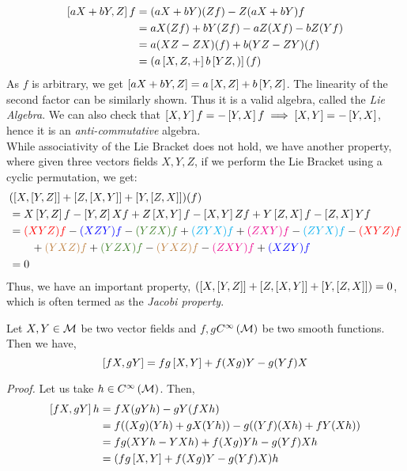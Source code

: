\begin{align*}
 \left[ aX+bY, Z \right]f &= (aX+bY)(Zf) - Z(aX+bY)f\\
 &=aX(Zf)+bY(Zf) - aZ(Xf)-bZ(Yf)\\
 &=a(XZ-ZX)(f) + b (YZ-ZY)(f)\\
 &=(a\left[ X,Z, + \right] b\left[ YZ, ) \right](f)
\end{align*}
As $f$ is arbitrary, we get $\left[ aX+bY, Z \right] = a\left[ X, Z \right]+b\left[ Y, Z \right]$. The linearity of the second factor can be similarly shown. Thus it is a valid algebra, called the \textit{Lie Algebra}. We can also check that $\left[ X, Y \right]f = -\left[ Y, X \right]f \implies \left[ X, Y \right] = -\left[ Y, X \right] $, hence it is an \textit{anti-commutative} algebra.\\[0.2cm]
While associativity of the Lie Bracket does not hold, we have another property, where given three vectors fields $X,Y,Z$, if we perform the Lie Bracket using a cyclic permutation, we get:
\begin{align*}
  &(\comtr{X}{\comtr{Y}{Z}}+ \comtr{Z}{\comtr{X}{Y}}+ \comtr{Y}{\comtr{Z}{X}})(f)\\
&= X\comtr{Y}{Z}f -\comtr{Y}{Z}Xf + Z\comtr{X}{Y}f - \comtr{X}{Y}Zf + Y\comtr{Z}{X}f-\comtr{Z}{X}Yf\\
&=\mathcolor{red}{(XYZ)f}-\mathcolor{blue}{(XZY)f}-\mathcolor{OliveGreen}{(YZX)f}+\mathcolor{cyan}{(ZYX)f} + \mathcolor{magenta}{(ZXY)f}-\mathcolor{cyan}{(ZYX)f} - \mathcolor{red}{(XYZ)f}\\ &\quad \quad +\mathcolor{brown}{(YXZ)f} + \mathcolor{OliveGreen}{(YZX)f} - \mathcolor{brown}{(YXZ)f}-\mathcolor{magenta}{(ZXY)f}+\mathcolor{blue}{(XZY)f }\\
&=0
\end{align*} 
Thus, we have an important property, $(\left[ X, \left[ Y, Z \right] \right]+ \left[ Z, \left[ X, Y \right] \right]+ \left[ Y, \left[ Z, X \right] \right])=0$, which is often termed as the \textit{Jacobi property}.
\begin{lemma}\label{lemma:lie}
  Let $X,Y\in \mathfrak{\mathcal M}$ be two vector fields and $f,g$\in $C^{\infty}\left(\mathcal M\right)$ be two smooth functions. Then we have,
  $$\left[ fX, gY \right] = fg\left[ X, Y \right] +f(Xg)Y- g(Yf)X$$
\end{lemma}
\textit{Proof.} Let us take $h\in C^{\infty}\left(\mathcal M\right)$. Then, 
\begin{align*}
  \left[ fX, gY \right]h &=fX(gYh) - gY(fXh)\\
  &=f((Xg)(Yh) + gX(Yh)) - g ((Yf)(Xh) + fY(Xh))\\
  &=fg (XYh -YXh) + f(Xg)Yh -g(Yf)Xh \\
  &=(fg \left[ X, Y \right] + f(Xg)Y -g(Yf)X)h
\end{align*}
